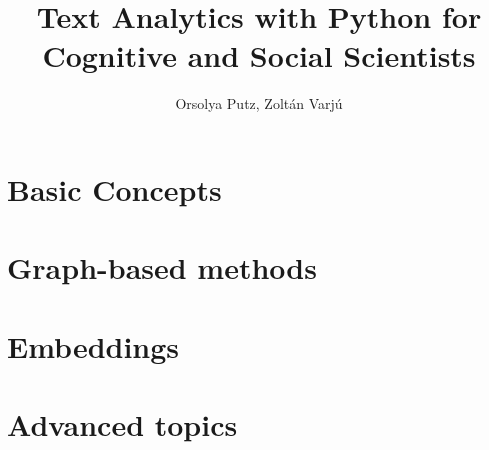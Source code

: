 \documentclass[krantz1,ChapterTOCs]{krantz}
\begin{document}
\frontmatter

\title{Text Analytics with Python for Cognitive and Social Scientists}
\author{Orsolya Putz, Zoltán Varjú}

\maketitle

%
\setcounter{page}{7} %
\tableofcontents
%
%
\listoffigures
\listoftables
%
%

\mainmatter

\part{Basic Concepts}






\part{Graph-based methods}



\part{Embeddings}



\part{Advanced topics}







\printindex
\end{document}
